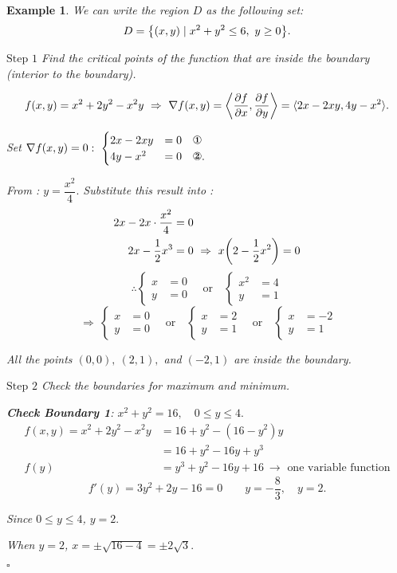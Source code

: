 \documentclass[12pt,a4paper]{article}
\newtheorem{eg}{Example}[subsection]
\newenvironment*{ans}{\par\indent{\textit{Answer. }}\par}{\par\hfill{$\square$}\par}
\begin{document}
\begin{eg}
\begin{ans}
		We can write the region $D$ as the following set: \[D=\qty{(x,y)\mid x^2+y^2\leq6,\ y\geq0}.\]\par$\boxed{\text{Step }1}$ Find the critical points of the function that are inside the boundary (interior to the boundary). \par\hspace{5mm} \[f(x,y)=x^2+2y^2-x^2y\ \Rightarrow\ \nabla f(x,y)=\left\langle\pdv{f}{x},\pdv{f}{y}\right\rangle=\langle2x-2xy, 4y-x^2\rangle.\]\par\hspace{5mm} Set $\nabla f(x,y)=0:\ \begin{cases} 2x-2xy&=0\quad\text{\ding{172}}\\4y-x^2&=0\quad\text{\ding{173}}.\end{cases}$\par\hspace{5mm} From : $y=\dfrac{x^2}{4}.$ Substitute this result into : \[\begin{aligned}2x-2x\cdot\frac{x^2}{4}&=0\\2x-\frac{1}{2}x^3&=0\ \Rightarrow\ x\qty(2-\frac{1}{2}x^2)=0\end{aligned}\]\[\therefore \begin{cases}x&=0\\y&=0\end{cases}\quad\text{or}\quad\begin{cases}x^2&=4\\y&=1\end{cases}\]\[\ \Rightarrow\ \begin{cases}x&=0\\y&=0\end{cases}\quad\text{or}\quad\begin{cases}x&=2\\y&=1\end{cases}\quad\text{or}\quad\begin{cases}x&=-2\\y&=1\end{cases}\]\par\hspace{5mm} All the points $(0,0),\ (2,1),$ and $(-2,1)$ are inside the boundary.\par$\boxed{\text{Step }2}$ Check the boundaries for maximum and minimum. \par\hspace{5mm}\textbf{Check Boundary 1}: $x^2+y^2=16,\quad0\leq y\leq4.$ \[\begin{aligned}f(x,y)=x^2+2y^2-x^2y&=16+y^2-(16-y^2)y\\&=16+y^2-16y+y^3\\f(y)&=y^3+y^2-16y+16\ \rightarrow\text{ one variable function}\end{aligned}\] \[f'(y)=3y^2+2y-16=0\qquad y=-\dfrac{8}{3},\quad y=2.\]\par\hspace{10mm} Since $0\leq y\leq4$, $y=2.$\par\hspace{10mm} When $y=2$, $x=\pm\sqrt{16-4}=\pm2\sqrt{3}.$ 
\end{ans}
\end{eg}
\end{document}
